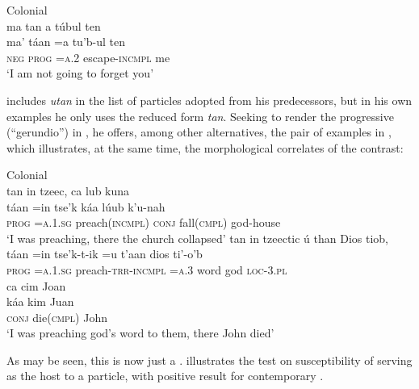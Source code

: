 \documentclass[output=paper]{langsci/langscibook}
\begin{document}
\ea\label{ex:lehmann:41}
Colonial  \\
      ma  tan    a      túbul        ten\\
\gll   ma’  táan    =a    tu’b-ul        ten\\
\textsc{neg}   \textsc{prog   }  \textsc{=a.2}    escape-\textsc{incmpl}  me\\
\glt
‘I am not going to forget you’ \citep[34]{Coronel1620}
\z



\citet[§261]{Beltrán1746} includes \textit{utan} in the list of particles adopted from his predecessors, but in his own examples he only uses the reduced form \textit{tan}. Seeking to render the  progressive (“gerundio”) in , he offers, among other alternatives, the pair of examples in , which illustrates, at the same time, the morphological correlates of the  contrast:


\ea\label{ex:lehmann:42}
Colonial  \\
\ea 
tan    in        tzeec,          ca      lub        kuna\\
\gll        táan    =in      tse’k          káa    lúub        k’u-nah\\
\textsc{prog}    \textsc{=a.1.sg}   preach\textsc{(incmpl)} \textsc{conj}    fall\textsc{(cmpl)}    god-house\\
\glt ‘I was preaching, there the church collapsed’
\ex 
tan    in        tzeectic          ú      than    Dios    tiob,\\
\gll  táan    =in      tse’k-t-ik          =u    t’aan  dios    ti’-o’b\\
\textsc{prog  }   \textsc{=a.1.sg}    preach-\textsc{trr-incmpl }  \textsc{=a.3}   word    god    \textsc{loc-3.pl}\\

  ca      cim        Joan\\
\gll   káa    kim        Juan\\
\textsc{conj}    die\textsc{(cmpl)}    John\\
\glt ‘I was preaching god’s word to them, there John died’ \citep[§262]{Beltrán1746} 
\z
\z 


As may be seen, this is now just a .  illustrates the test on susceptibility of serving as the host to a  particle, with positive result for contemporary  .
\end{document}

